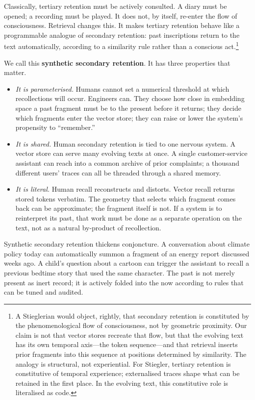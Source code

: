Classically, tertiary retention must be actively consulted. A diary must be opened; a recording must be played. It does not, by itself, re-enter the flow of consciousness. Retrieval changes this. It makes tertiary retention behave like a programmable analogue of secondary retention: past inscriptions return to the text automatically, according to a similarity rule rather than a conscious act.\footnote{A Stieglerian would object, rightly, that secondary retention is constituted by the phenomenological flow of consciousness, not by geometric proximity. Our claim is not that vector stores recreate that flow, but that the evolving text has its own temporal axis---the token sequence---and that retrieval inserts prior fragments into this sequence at positions determined by similarity. The analogy is structural, not experiential. For Stiegler, tertiary retention is constitutive of temporal experience; externalised traces shape what can be retained in the first place. In the evolving text, this constitutive role is literalised as code.}

We call this \textbf{synthetic secondary retention}. It has three properties that matter.

\begin{itemize}
  \item \emph{It is parameterised.} Humans cannot set a numerical threshold at which recollections will occur. Engineers can. They choose how close in embedding space a past fragment must be to the present before it returns; they decide which fragments enter the vector store; they can raise or lower the system's propensity to ``remember.''

  \item \emph{It is shared.} Human secondary retention is tied to one nervous system. A vector store can serve many evolving texts at once. A single customer-service assistant can reach into a common archive of prior complaints; a thousand different users' traces can all be threaded through a shared memory.

  \item \emph{It is literal.} Human recall reconstructs and distorts. Vector recall returns stored tokens verbatim. The geometry that selects which fragment comes back can be approximate; the fragment itself is not. If a system is to reinterpret its past, that work must be done as a separate operation on the text, not as a natural by-product of recollection.
\end{itemize}

Synthetic secondary retention thickens conjoncture. A conversation about climate policy today can automatically summon a fragment of an energy report discussed weeks ago. A child's question about a cartoon can trigger the assistant to recall a previous bedtime story that used the same character. The past is not merely present as inert record; it is actively folded into the now according to rules that can be tuned and audited.

